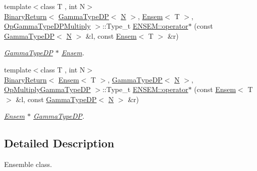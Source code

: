 \begin{DoxyCompactItemize}
{\footnotesize template$<$class T , int N$>$ }\\\mbox{\hyperlink{structENSEM_1_1BinaryReturn}{Binary\+Return}}$<$ \mbox{\hyperlink{classENSEM_1_1GammaTypeDP}{Gamma\+Type\+DP}}$<$ \mbox{\hyperlink{adat__devel_2lib_2hadron_2operator__name__util_8cc_a7722c8ecbb62d99aee7ce68b1752f337}{N}} $>$, \mbox{\hyperlink{classENSEM_1_1Ensem}{Ensem}}$<$ T $>$, \mbox{\hyperlink{structENSEM_1_1OpGammaTypeDPMultiply}{Op\+Gamma\+Type\+D\+P\+Multiply}} $>$\+::Type\+\_\+t \mbox{\hyperlink{group__eensem_ga53d61b0a5109e4f59f7b77a3fb4817f9}{E\+N\+S\+E\+M\+::operator$\ast$}} (const \mbox{\hyperlink{classENSEM_1_1GammaTypeDP}{Gamma\+Type\+DP}}$<$ \mbox{\hyperlink{adat__devel_2lib_2hadron_2operator__name__util_8cc_a7722c8ecbb62d99aee7ce68b1752f337}{N}} $>$ \&l, const \mbox{\hyperlink{classENSEM_1_1Ensem}{Ensem}}$<$ T $>$ \&r)
\begin{DoxyCompactList}\small\item\em \mbox{\hyperlink{classENSEM_1_1GammaTypeDP}{Gamma\+Type\+DP}} $\ast$ \mbox{\hyperlink{classENSEM_1_1Ensem}{Ensem}}. \end{DoxyCompactList}\item 
{\footnotesize template$<$class T , int N$>$ }\\\mbox{\hyperlink{structENSEM_1_1BinaryReturn}{Binary\+Return}}$<$ \mbox{\hyperlink{classENSEM_1_1Ensem}{Ensem}}$<$ T $>$, \mbox{\hyperlink{classENSEM_1_1GammaTypeDP}{Gamma\+Type\+DP}}$<$ \mbox{\hyperlink{adat__devel_2lib_2hadron_2operator__name__util_8cc_a7722c8ecbb62d99aee7ce68b1752f337}{N}} $>$, \mbox{\hyperlink{structENSEM_1_1OpMultiplyGammaTypeDP}{Op\+Multiply\+Gamma\+Type\+DP}} $>$\+::Type\+\_\+t \mbox{\hyperlink{group__eensem_ga28d880d590e554a96424952e16186000}{E\+N\+S\+E\+M\+::operator$\ast$}} (const \mbox{\hyperlink{classENSEM_1_1Ensem}{Ensem}}$<$ T $>$ \&l, const \mbox{\hyperlink{classENSEM_1_1GammaTypeDP}{Gamma\+Type\+DP}}$<$ \mbox{\hyperlink{adat__devel_2lib_2hadron_2operator__name__util_8cc_a7722c8ecbb62d99aee7ce68b1752f337}{N}} $>$ \&r)
\begin{DoxyCompactList}\small\item\em \mbox{\hyperlink{classENSEM_1_1Ensem}{Ensem}} $\ast$ \mbox{\hyperlink{classENSEM_1_1GammaTypeDP}{Gamma\+Type\+DP}}. \end{DoxyCompactList}\end{DoxyCompactItemize}


\subsection{Detailed Description}
Ensemble class. 



